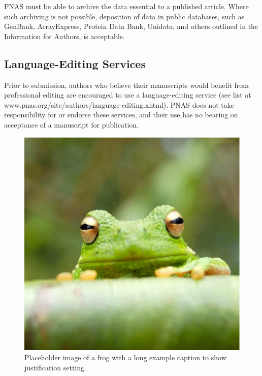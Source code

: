 \documentclass[9pt,twocolumn,twoside]{pnas-new}
\begin{document}
PNAS must be able to archive the data essential to a published article. Where such archiving is not possible, deposition of data in public databases, such as GenBank, ArrayExpress, Protein Data Bank, Unidata, and others outlined in the Information for Authors, is acceptable.

\subsection*{Language-Editing Services}
Prior to submission, authors who believe their manuscripts would benefit from professional editing are encouraged to use a language-editing service (see list at www.pnas.org/site/authors/language-editing.xhtml). PNAS does not take responsibility for or endorse these services, and their use has no bearing on acceptance of a manuscript for publication. 

\begin{figure}%
\centering
\includegraphics[width=.8\linewidth]{figures/frog}
\caption{Placeholder image of a frog with a long example caption to show justification setting.}
\label{fig:frog}
\end{figure}
\end{document}
